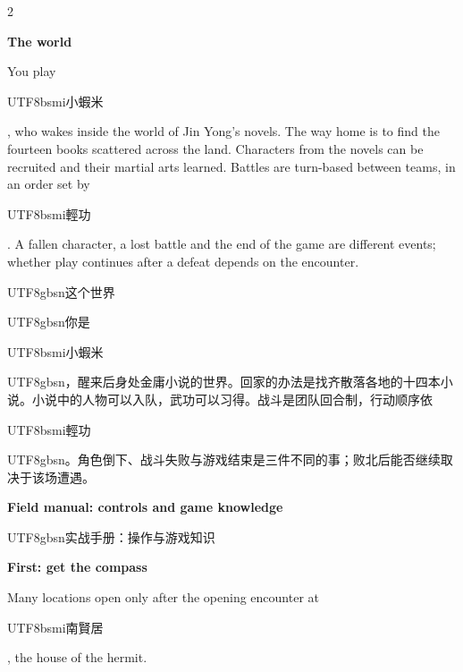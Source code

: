 \begin{paracol}{2}
\switchcolumn*
\footnotesize\setlength{\parskip}{2pt}
{\footnotesize\bfseries The world\par}
You play \begin{CJK}{UTF8}{bsmi}小蝦米\end{CJK}, who wakes inside the world of Jin Yong's novels. The way home is to find the fourteen books scattered across the land. Characters from the novels can be recruited and their martial arts learned. Battles are turn-based between teams, in an order set by \begin{CJK}{UTF8}{bsmi}輕功\end{CJK}. A fallen character, a lost battle and the end of the game are different events; whether play continues after a defeat depends on the encounter.\par
\switchcolumn
\footnotesize\setlength{\parskip}{2pt}
{\footnotesize\bfseries \begin{CJK}{UTF8}{gbsn}这个世界\end{CJK}\par}
\begin{CJK}{UTF8}{gbsn}你是\end{CJK}\begin{CJK}{UTF8}{bsmi}小蝦米\end{CJK}\begin{CJK}{UTF8}{gbsn}，醒来后身处金庸小说的世界。回家的办法是找齐散落各地的十四本小说。小说中的人物可以入队，武功可以习得。战斗是团队回合制，行动顺序依\end{CJK}\begin{CJK}{UTF8}{bsmi}輕功\end{CJK}\begin{CJK}{UTF8}{gbsn}。角色倒下、战斗失败与游戏结束是三件不同的事；败北后能否继续取决于该场遭遇。\end{CJK}\par
\switchcolumn*
\footnotesize\setlength{\parskip}{2pt}
{\small\bfseries Field manual: controls and game knowledge\par}
\switchcolumn
\footnotesize\setlength{\parskip}{2pt}
{\small\bfseries \begin{CJK}{UTF8}{gbsn}实战手册：操作与游戏知识\end{CJK}\par}
\switchcolumn*
\footnotesize\setlength{\parskip}{2pt}
{\footnotesize\bfseries First: get the compass\par}
Many locations open only after the opening encounter at \begin{CJK}{UTF8}{bsmi}南賢居\end{CJK}, the house of the hermit.\par

\end{paracol}

